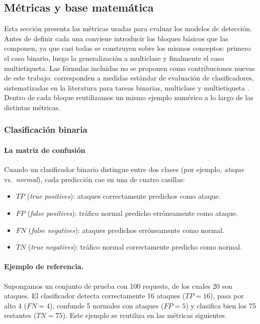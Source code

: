 \documentclass[12pt,oneside]{report}
\begin{document}
\subsection{Métricas y base matemática}

Esta sección presenta las métricas usadas para evaluar los modelos de
detección. Antes de definir cada una conviene introducir los bloques
básicos que las componen, ya que casi todas se construyen sobre los
mismos conceptos: primero el caso binario, luego la generalización a
multiclase y finalmente el caso multietiqueta. Las fórmulas incluidas no
se proponen como contribuciones nuevas de este trabajo: corresponden a
medidas estándar de evaluación de clasificadores, sistematizadas en la
literatura para tareas binarias, multiclase y multietiqueta
\cite{sokolova_lapalme_2009,powers2011}. Dentro de cada bloque
reutilizamos un mismo ejemplo numérico a lo largo de las distintas
métricas.

\subsubsection{Clasificación binaria}

\paragraph{La matriz de confusión}

Cuando un clasificador binario distingue entre dos clases (por ejemplo,
\emph{ataque} vs.\ \emph{normal}), cada predicción cae en una de cuatro
casillas:
\begin{itemize}[leftmargin=*]
  \item $TP$ (\emph{true positives}): ataques correctamente predichos como ataque.
  \item $FP$ (\emph{false positives}): tráfico normal predicho erróneamente como ataque.
  \item $FN$ (\emph{false negatives}): ataques predichos erróneamente como normal.
  \item $TN$ (\emph{true negatives}): tráfico normal correctamente predicho como normal.
\end{itemize}

\paragraph{Ejemplo de referencia.} Supongamos un conjunto de prueba con
100 requests, de los cuales 20 son ataques. El clasificador detecta
correctamente 16 ataques ($TP=16$), pasa por alto 4 ($FN=4$), confunde 5
normales con ataques ($FP=5$) y clasifica bien los 75 restantes
($TN=75$). Este ejemplo se reutiliza en las métricas siguientes.
\end{document}
